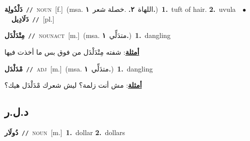 \documentclass[10pt,a4paper,twoside]{article} %
\begin{document}
\begin{multicols}{2}
{\setlength\topsep{0pt}\textbf{\foreignlanguage{arabic}{دَلْدُولِة}}\ {\color{gray}\texttt{//}\color{black}}\ \textsc{noun}\ [f.]\ \color{gray}(msa. \foreignlanguage{arabic}{اللهاة}~\foreignlanguage{arabic}{\textbf{٢.}}  .\foreignlanguage{arabic}{خصلة شعر}~\foreignlanguage{arabic}{\textbf{١.}})\color{black}\ \textbf{1.}~tuft of hair.  \textbf{2.}~uvula\ \ $\bullet$\ \ \setlength\topsep{0pt}\textbf{\foreignlanguage{arabic}{دَلَادِيل}}\ {\color{gray}\texttt{//}\color{black}}\ [pl.]\ } \vspace{2mm}

{\setlength\topsep{0pt}\textbf{\foreignlanguage{arabic}{مِتْدَلْدَل}}\ {\color{gray}\texttt{//}\color{black}}\ \textsc{noun\textunderscore act}\ [m.]\ \color{gray}(msa. \foreignlanguage{arabic}{متدَلِّي}~\foreignlanguage{arabic}{\textbf{١.}})\color{black}\ \textbf{1.}~dangling\  \begin{flushright}\color{gray}\foreignlanguage{arabic}{\textbf{\underline{\foreignlanguage{arabic}{أمثلة}}}: شفته مِتْدَلْدَل من فوق بس ما أخذت فيها}\end{flushright}\color{black}} \vspace{2mm}

{\setlength\topsep{0pt}\textbf{\foreignlanguage{arabic}{مْدَلْدَل}}\ {\color{gray}\texttt{//}\color{black}}\ \textsc{adj}\ [m.]\ \color{gray}(msa. \foreignlanguage{arabic}{متدَلِّي}~\foreignlanguage{arabic}{\textbf{١.}})\color{black}\ \textbf{1.}~dangling\  \begin{flushright}\color{gray}\foreignlanguage{arabic}{\textbf{\underline{\foreignlanguage{arabic}{أمثلة}}}: مش أنت زلمة؟ ليش شعرك مْدَلْدَل هيك؟}\end{flushright}\color{black}} \vspace{2mm}

\vspace{-3mm}
\subsection*{\color{blue}\foreignlanguage{arabic}{د.ل.ر}\color{blue}{ (ntws)}} 

{\setlength\topsep{0pt}\textbf{\foreignlanguage{arabic}{دُولَار}}\ {\color{gray}\texttt{//}\color{black}}\ \textsc{noun}\ [m.]\ \textbf{1.}~dollar  \textbf{2.}~dollars\ } \vspace{2mm}


\end{multicols}
\end{document}
